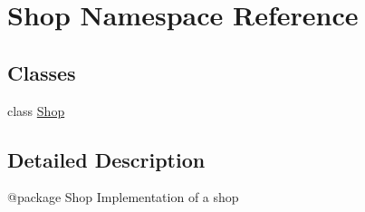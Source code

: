 \hypertarget{namespace_shop}{}\section{Shop Namespace Reference}
\label{namespace_shop}
\subsection*{Classes}
\begin{DoxyCompactItemize}
\item 
class \mbox{\hyperlink{class_shop_1_1_shop}{Shop}}
\end{DoxyCompactItemize}


\subsection{Detailed Description}
\begin{DoxyVerb}@package Shop
Implementation of a shop
\end{DoxyVerb}
 